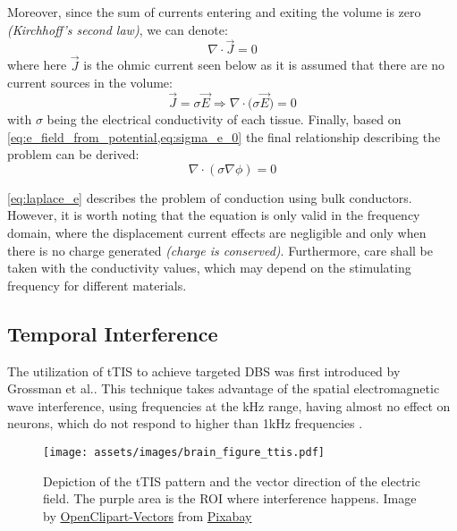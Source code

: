 \noindent Moreover, since the sum of currents entering and exiting the volume is zero \textit{(Kirchhoff's second law)}, we can denote:
\begin{equation}
    \nabla\cdot\vec{J} = 0
\end{equation}
where here $\vec{J}$ is the ohmic current seen below as it is assumed that there are no current sources in the volume:
\begin{equation}
    \label{eq:sigma_e_0}
    \vec{J} = \sigma\vec{E}\Rightarrow\boxed{\nabla\cdot\big(\sigma\vec{E}\big) = 0}
\end{equation}
with $\sigma$ being the electrical conductivity of each tissue. Finally, based on \cref{eq:e_field_from_potential,eq:sigma_e_0} the final relationship describing the problem can be derived:
\begin{equation}
    \label{eq:laplace_e}
    \boxed{\nabla\cdot(\sigma\nabla\phi) = 0}
\end{equation}

\autoref{eq:laplace_e} describes the problem of conduction using bulk conductors. However, it is worth noting that the equation is only valid in the frequency domain, where the displacement current effects are negligible and only when there is no charge generated \textit{(charge is conserved)}. Furthermore, care shall be taken with the conductivity values, which may depend on the stimulating frequency for different materials.

\pagebreak
\subsection{Temporal Interference}
The utilization of \gls{tTIS} to achieve targeted \gls{DBS} was first introduced by Grossman et al.\cite{Grossman2017}. This technique takes advantage of the spatial electromagnetic wave interference, using frequencies at the \si{kHz} range, having almost no effect on neurons, which do not respond to higher than 1\si{kHz} frequencies \cite{Hutcheon2000}.
\\\vspace{1pt}

\begin{wrapfigure}{r}{0.48\textwidth}
    \vspace{-10pt}
    \centering
    \texttt{[image: assets/images/brain\_figure\_ttis.pdf]}
    \caption[Depiction of the \gls{tTIS} pattern and the vector direction of the electric field. The purple area is the \gls{ROI} where interference happens.]{Depiction of the \gls{tTIS} pattern and the vector direction of the electric field. The purple area is the \gls{ROI} where interference happens. Image by \href{https://pixabay.com/users/openclipart-vectors-30363/?utm_source=link-attribution&amp;utm_medium=referral&amp;utm_campaign=image&amp;utm_content=150935}{OpenClipart-Vectors} from \href{https://pixabay.com/?utm_source=link-attribution&amp;utm_medium=referral&amp;utm_campaign=image&amp;utm_content=150935}{Pixabay}}
    \label{fig:brain_elec_demo}
\end{wrapfigure}

